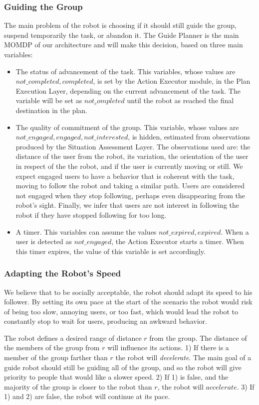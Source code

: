 \subsubsection{Guiding the Group}
The main problem of the robot is choosing if it should still guide the group, suspend temporarily the task, or abandon it. The Guide Planner is the main MOMDP of our architecture and will make this decision, based on three main variables: 
\begin{itemize}
\item The status of advancement of the task. This variables, whose values are ${not\_completed, completed}$, is set by the Action Executor module, in the Plan Execution Layer, depending on the current advancement of the task. The variable will be set as $not_completed$ until the robot as reached the final destination in the plan. 
\item The quality of commitment of the group. This variable, whose values are ${not\_engaged, engaged, not\_interested}$, is hidden, estimated from observations produced by the Situation Assessment Layer. The observations used are: the distance of the user from the robot, its variation, the orientation of the user in respect of the the robot, and if the user is currently moving or still. We expect engaged users to have a behavior that is coherent with the task, moving to follow the robot and taking a similar path. Users are considered not engaged when they stop following, perhaps even disappearing from the robot's sight. Finally, we infer that users are not interest in following the robot if they have stopped following for too long.
\item A timer. This variables can assume the values ${not\_expired, expired}$. When a user is detected as $not\_engaged$, the Action Executor starts a timer. When this timer expires, the value of this variable is set accordingly.
\end{itemize}

\subsubsection{Adapting the Robot's Speed}
We believe that to be socially acceptable, the robot should adapt its speed to his follower. By setting its own pace at the start of the scenario the robot  would risk of being too slow, annoying users, or too fast, which would lead the robot to constantly stop to wait for users, producing an awkward behavior.

The robot defines a desired range of distance $r$ from the group. The distance of the  members of the group from $r$ will influence its actions. 1) If there is a member of the group farther than $r$ the robot will \textit{decelerate}. The main goal of a guide robot should still be guiding all of the group, and so the robot will give priority to people that would like a slower speed. 2) If 1) is false, and the majority of the group is closer to the robot than $r$, the robot will $accelerate$. 3) If 1) and 2) are false, the robot will continue at its pace.


